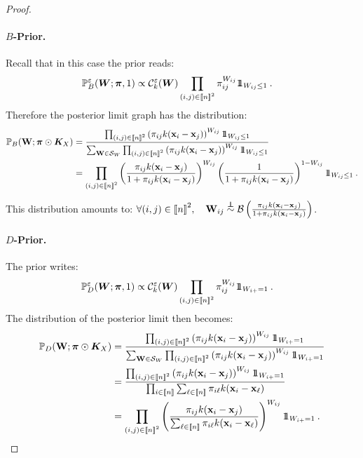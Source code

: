 \begin{proof}
\paragraph{$B$-Prior.}
Recall that in this case the prior reads:
\begin{align*}
    \mathbb{P}_{B}^{\varepsilon}(\bm{W}; \bm{\pi},1) &\propto \mathcal{C}_{k}^{\varepsilon}(\bm{W}) \prod_{(i,j) \in {[\![n]\!]}^2} \pi_{ij}^{W_{ij}} 1\!\!1_{W_{ij} \leq 1} \:.
\end{align*}
Therefore the posterior limit graph has the distribution:
\begin{align*}
    \mathbb{P}_{B}(\W ;\bm{\pi} \odot \bm{K}_{X})
    &= \frac{\prod_{(i,j) \in \integ{n}^2}  \left(\pi_{ij} k(\mathbf{x}_i - \mathbf{x}_j)\right)^{W_{ij}} \ind_{W_{ij} \leq 1}}{\sum_{\W \in \mathcal{S}_{W}} \prod_{(i,j) \in \integ{n}^2}  \left(\pi_{ij} k(\mathbf{x}_i - \mathbf{x}_j)\right)^{W_{ij}} \ind_{W_{ij} \leq 1}} \\
    &= \prod_{(i,j) \in \integ{n}^2}  \left(\frac{\pi_{ij} k(\mathbf{x}_i - \mathbf{x}_j)}{1+\pi_{ij} k(\mathbf{x}_i - \mathbf{x}_j)}\right)^{W_{ij}} \left(\frac{1}{1+\pi_{ij} k(\mathbf{x}_i - \mathbf{x}_j)}\right)^{1-W_{ij}} \ind_{W_{ij} \leq 1} \:.
\end{align*}

This distribution amounts to: $\forall (i,j) \in {[\![n]\!]}^2, \quad \mathbf{W}_{ij} \stackrel{\perp\!\!\!\!\perp}{\sim} \mathcal{B}\left( \frac{\pi_{ij} k(\mathbf{x}_i - \mathbf{x}_j)}{1+\pi_{ij} k(\mathbf{x}_i - \mathbf{x}_j)} \right)$.

\paragraph{$D$-Prior.} The prior writes:
\begin{align*}
    \mathbb{P}_{D}^{\varepsilon}(\bm{W}; \bm{\pi}, 1) &\propto \mathcal{C}_{k}^{\varepsilon}(\bm{W}) \prod_{(i,j) \in {[\![n]\!]}^2} \pi_{ij}^{W_{ij}} 1\!\!1_{W_{i+} = 1} \:.
\end{align*}
The distribution of the posterior limit then becomes:
\begin{align*}
    \mathbb{P}_{D}(\W ;\bm{\pi} \odot \bm{K}_{X}) &= \frac{\prod_{(i,j) \in \integ{n}^2}  \left(\pi_{ij} k(\mathbf{x}_i - \mathbf{x}_j)\right)^{W_{ij}} \ind_{W_{i+} = 1}}{\sum_{\W \in \mathcal{S}_{W}} \prod_{(i,j) \in \integ{n}^2}  \left(\pi_{ij} k(\mathbf{x}_i - \mathbf{x}_j)\right)^{W_{ij}} \ind_{W_{i+} = 1}} \\
    &= \frac{\prod_{(i,j) \in \integ{n}^2}  \left(\pi_{ij} k(\mathbf{x}_i - \mathbf{x}_j)\right)^{W_{ij}} \ind_{W_{i+} = 1}}{\prod_{i \in \integ{n}} \sum_{\ell \in \integ{n}} \pi_{i\ell} k(\mathbf{x}_i - \mathbf{x}_{\ell})} \\
    &= \prod_{(i,j) \in \integ{n}^2} \left(\frac{\pi_{ij} k(\mathbf{x}_i - \mathbf{x}_j)}{\sum_{\ell \in \integ{n}} \pi_{i\ell} k(\mathbf{x}_i - \mathbf{x}_{\ell})}\right)^{W_{ij}} \ind_{W_{i+} = 1} \:.
\end{align*}


\end{proof}
